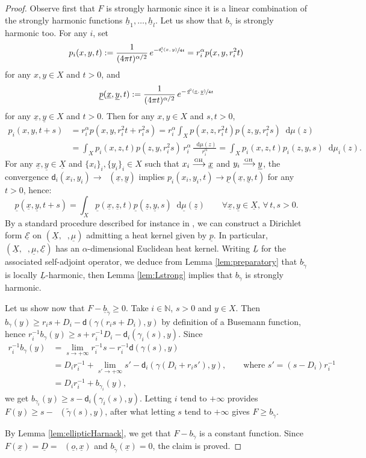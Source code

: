 \documentclass[10pt]{amsart}
\def\To#1{\mathchoice{\xrightarrow{\textstyle\kern4pt#1\kern3pt}}{\stackrel{#1}{\longrightarrow}}{}{}}
\newcommand{\sGH}{{\scriptscriptstyle\mathrm{GH}\,}}
\theoremstyle{plain}
\theoremstyle{definition}
\newcommand{\setN}{\mathbb{N}}
\newcommand{\cE}{\mathcal{E}}
\newcommand{\di}{\mathop{}\!\mathrm{d}}
\newcommand{\dist}{\mathsf{d}}
\newcommand{\uX}{\underline{X}}
\DeclareMathOperator{\udist}{\underline{\dist}}
\newcommand{\uo}{\underline{o}}
\newcommand{\ux}{\underline{x}}
\newcommand{\uz}{\underline{z}}
\newcommand{\uD}{\underline{D}}
\newcommand{\umu}{\underline{\mu}}
\newcommand{\uy}{\underline{y}}
\newcommand{\upp}{\underline{p}}
\newcommand{\uh}{\underline{h}}
\begin{document}
\begin{proof}
Observe first that $F$ is strongly harmonic since it is a linear combination of the strongly harmonic functions $\uh_1,\ldots,\uh_l$. Let us show that $b_{\tilde{\gamma}}$ is strongly harmonic too. For any $i$, set
\[
p_i(x,y,t):=\frac{1}{(4\pi t)^{\alpha/2}}\, e^{-\sfrac{\dist_i^2(x,y)}{4t}}= r_i^\alpha p(x,y,r_i^2 t)
\]
for any $x,y \in X$ and $t>0$, and
\[
\underline{p}(\ux,\uy,t):= \frac{1}{(4 \pi t)^{\alpha/2}}\, e^{-\sfrac{\udist^2(\ux,\uy)}{4t}}
\]
for any $\ux,\uy \in X$ and $t>0$. Then for any $x,y \in X$ and $s,t>0$,
\begin{align*}
p_i(x,y,t+s) & = r_i^\alpha p(x,y,r_i^2 t + r_i^2 s) = r_i^\alpha \int_X p(x,z,r_i^2 t)p(z,y,r_i^2 s) \di \mu(z)\\
& = \int_X p_i(x,z,t)p(z,y,r_i^2s) \,r_i^\alpha\, \frac{\di \mu(z)}{r_i^\alpha} = \int_X p_i(x,z,t)p_i(z,y,s) \di \mu_i(z).
\end{align*}
For any $\ux, \uy \in \uX$ and $\{x_i\}_i, \{y_i\}_i \in X$ such that $x_i \To{\sGH} \ux$ and $y_i \To{\sGH} \uy$, the convergence $\dist_i(x_i,y_i) \to \udist(\ux,\uy)$ implies $p_i(x_i,y_i,t) \to \upp(\ux,\uy,t)$ for any $t>0$, hence:
\[
\underline{p}(\ux,\uy,t+s) = \int_X \underline{p}(\ux,\uz,t) \underline{p}(\uz,\uy,s) \di \umu(\uz) \qquad \forall \ux, \uy \in \uX, \, \forall \, t,s>0.
\]
By a standard procedure described for instance in \cite[\S 2]{Grigor'yan}, we can construct a Dirichlet form $\underline{\cE}$ on $(\uX,\udist,\umu)$ admitting a heat kernel given by $\underline{p}$. In particular, $(\uX,\udist,\umu,\underline{\cE})$ has an $\alpha$-dimensional Euclidean heat kernel. Writing $\underline{L}$ for the associated self-adjoint operator, we deduce from Lemma \ref{lem:preparatory} that $b_{\tilde{\gamma}}$ is locally $\underline{L}$-harmonic, then Lemma \ref{lem:Lstrong} implies that $b_{\tilde{\gamma}}$ is strongly harmonic.

Let us show now that $F - \underline{b}_{\tilde{\gamma}} \ge 0$. Take $i\in \setN$, $s>0$ and $y \in X$. Then $b_\gamma(y) \ge r_i s + D_i - \dist(\gamma(r_i s+D_i),y)$ by definition of a Busemann function, hence \hbox{$r_i^{-1}b_\gamma(y) \ge s+ r_i^{-1} D_i - \dist_i(\gamma_i(s),y)$}. Since
\begin{align*}
r_i^{-1}b_\gamma(y) & = \lim_{s \to +\infty} r_i^{-1} s - r_i^{-1} \dist(\gamma(s),y)\\
& = D_i r_i^{-1} + \lim_{s' \to +\infty} s' - \dist_i(\gamma(D_i+r_i s'),y),\qquad \text{where $s'=(s-D_i)r_i^{-1}$}\\ & = D_i r_i^{-1} + b_{\gamma_i}(y),
\end{align*}
we get $b_{\gamma_i}(y) \ge s - \dist_i(\gamma_i(s),y)$. Letting $i$ tend to $+\infty$ provides $F(y)\ge s - \udist(\tilde{\gamma}(s),y)$, after what letting $s$ tend to $+\infty$ gives $F\ge b_{\tilde{\gamma}}$.

By Lemma \ref{lem:ellipticHarnack}, we get that $F-b_{\tilde{\gamma}}$ is a constant function. Since $F(\ux)=\uD=\udist(\uo,\ux) $ and $b_{\tilde{\gamma}}(\ux)=0$, the claim is proved.
\end{proof}
\end{document}
